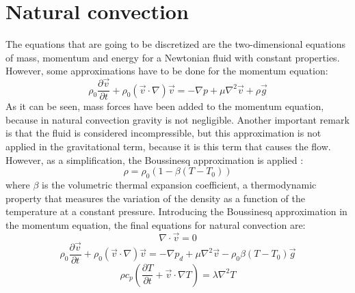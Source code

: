 \section{Natural convection}
The equations that are going to be discretized are the two-dimensional equations of mass, momentum and energy for a Newtonian fluid with constant properties. However, some approximations have to be done for the momentum equation:
\begin{equation}
\rho_{0}\frac{\partial\vec{v}}{\partial t}+\rho_{0}\left(\vec{v}\cdot\nabla\right)\vec{v}=-\nabla p+\mu\nabla^{2}\vec{v}+\rho\vec{g}
\end{equation}
As it can be seen, mass forces have been added to the momentum equation, because in natural convection gravity is not negligible. Another important remark is that the fluid is considered incompressible, but this approximation is not applied in the gravitational term, because it is this term that causes the flow. However, as a simplification, the Boussinesq approximation is applied \cite{Bergman2011,Ghiaasiaan2011}:
\begin{equation}
\rho=\rho_{0}\left(1-\beta\left(T-T_{0}\right)\right)
\end{equation}
where $\beta$ is the volumetric thermal expansion coefficient, a thermodynamic property that measures the variation of the density as a function of the temperature at a constant pressure.
Introducing the Boussinesq approximation in the momentum equation, the final equations for natural convection are:
\begin{equation}
\nabla\cdot\vec{v}=0
\label{NatConvContinuity}
\end{equation}
\begin{equation}
\rho_{0}\frac{\partial\vec{v}}{\partial t}+\rho_{0}\left(\vec{v}\cdot\nabla\right)\vec{v}=-\nabla p_{d}+\mu\nabla^{2}\vec{v}-\rho_{0}\beta\left(T-T_{0}\right)\vec{g}
\label{NatConvMomentum}
\end{equation}
\begin{equation}
\rho c_{p}\left(\frac{\partial T}{\partial t}+\vec{v}\cdot\nabla T\right)=\lambda\nabla^{2}T
\label{NatConvEnergy}
\end{equation}


